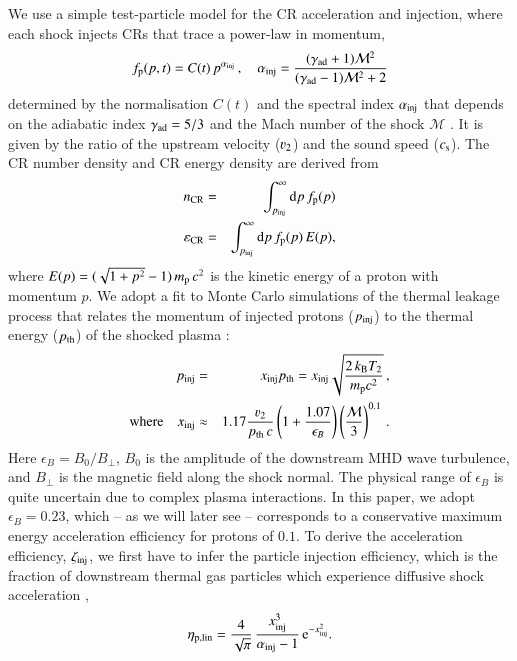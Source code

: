 \documentclass[fleqn,usenatbib,useAMS]{mnras}
\newcommand\C[1]{{\bf #1}}
\newcommand{\dd}{\mathrm{d}}
\newcommand{\eb}{\epsilon_B}
\newcommand{\p}{\rmn{p}}
\newcommand{\kB}{k_{\rmn{B}}}
\newcommand{\eps}{\varepsilon}
\newcommand{\CR}{\rmn{CR}}
\begin{document}
We use a simple test-particle model for the CR acceleration and
injection, where each shock injects CRs that trace a power-law in
momentum,
\begin{equation}
  f_\p(p,t) = C(t)\,p^{\alpha_\rmn{inj}}\,,\quad
  \alpha_\rmn{inj}=\frac{(\gamma_\rmn{ad}+1)\mathcal{M}^2}
        {(\gamma_\rmn{ad}-1)\mathcal{M}^2+2}
\end{equation}
determined by the normalisation $C(t)$ and the spectral index
$\alpha_{{\mathrm{inj}}}$ that depends on the adiabatic index
$\gamma_{\mathrm{ad}} = 5/3$ and the Mach number of the shock
$\mathcal{M}$ \C{\citep[see also ][]{1998ApJ...502..518Q,miniati01,pfrommer06}}. It is given by the ratio of the upstream velocity
($\varv_2$) and the sound speed ($c_{\rm s}$). The CR number density and CR
energy density are derived from
\begin{eqnarray}
n_\CR &=&
\int_{p_\rmn{inj}}^\infty \dd p\, f_\p(p)\\
\eps_\CR &=&
\int_{p_\rmn{inj}}^\infty \dd p\, f_\p(p) \,E(p),
\end{eqnarray}
where $E(p) = (\sqrt{1+p^2} -1)\, m_{{\mathrm{p}}}\,c^2$ is the kinetic energy of a
proton with momentum $p$. We adopt a fit to Monte Carlo simulations of the
thermal leakage process that relates the momentum of injected protons
($p_{\mathrm{inj}}$) to the thermal energy ($p_{\mathrm{th}}$) of the shocked plasma
\citep{kang11}:
\begin{eqnarray}
  \label{eq:qinj}
  p_\rmn{inj} &=& x_\rmn{inj} p_\rmn{th} =
  x_\rmn{inj} \sqrt{\frac{2 \,\kB T_2}{m_{\rmn{p}} c^2}}\,, \nonumber \\
  \rmn{where}\quad x_\rmn{inj} &\approx& 1.17 \frac{\varv_2}{p_{\rmn{th}}\,c} \left(1+
  \frac{1.07}{\eb}\right) \left(\frac{\mathcal{M}}{3}\right)^{0.1}\,.
\end{eqnarray}
Here $\eb = B_0/B_{\perp}$, $B_0$ is the amplitude of the downstream
MHD wave turbulence, and $B_{\perp}$ is the magnetic field along the
shock normal. The physical range of $\eb$ is quite uncertain due to
complex plasma interactions. In this paper, we adopt $\eb = 0.23$,
which -- as we will later see -- corresponds to a conservative maximum
energy acceleration efficiency for protons of $0.1$. To derive the
acceleration efficiency, $\zeta_{\mathrm{inj}}$, we first have to infer the
particle injection efficiency, which is the fraction of downstream
thermal gas particles which experience diffusive shock acceleration
\citep[for details see][]{pinzke13},
\begin{equation}
  \label{eq:eta}
  \eta_{\mathrm{p,lin}} =
  \frac{4}{\sqrt{\pi}}\,\frac{x_{\mathrm{inj}}^3}{\alpha_{\mathrm{inj}}-1}\,
  {\mathrm{e}}^{-x_{\mathrm{inj}}^2}.
\end{equation}
\end{document}

